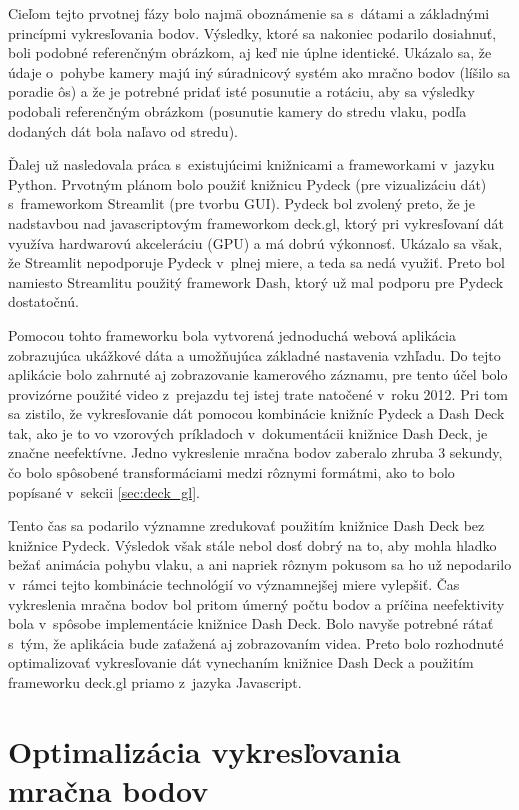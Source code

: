 Cieľom tejto prvotnej fázy bolo najmä oboznámenie sa s~dátami a základnými princípmi vykresľovania bodov. Výsledky, ktoré sa nakoniec podarilo dosiahnuť, boli podobné referenčným obrázkom, aj keď nie úplne identické. Ukázalo sa, že údaje o~pohybe kamery majú iný súradnicový systém ako mračno bodov (líšilo sa poradie ôs) a že je potrebné pridať isté posunutie a rotáciu, aby sa výsledky podobali referenčným obrázkom (posunutie kamery do stredu vlaku, podľa dodaných dát bola naľavo od stredu).

Ďalej už nasledovala práca s~existujúcimi knižnicami a frameworkami v~jazyku Python. Prvotným plánom bolo použiť knižnicu Pydeck (pre vizualizáciu dát) s~frameworkom Streamlit (pre tvorbu GUI). Pydeck bol zvolený preto, že je nadstavbou nad javascriptovým frameworkom deck.gl, ktorý pri vykresľovaní dát využíva hardwarovú akceleráciu (GPU) a má dobrú výkonnosť. Ukázalo sa však, že Streamlit nepodporuje Pydeck v~plnej miere, a teda sa nedá využiť. Preto bol namiesto Streamlitu použitý framework Dash, ktorý už mal podporu pre Pydeck dostatočnú.

Pomocou tohto frameworku bola vytvorená jednoduchá webová aplikácia zobrazujúca ukážkové dáta a umožňujúca základné nastavenia vzhľadu. Do tejto aplikácie bolo zahrnuté aj zobrazovanie kamerového záznamu, pre tento účel bolo provizórne použité video z~prejazdu tej istej trate natočené v~roku 2012. Pri tom sa zistilo, že vykresľovanie dát pomocou kombinácie knižníc Pydeck a Dash Deck tak, ako je to vo vzorových príkladoch v~dokumentácii knižnice Dash Deck, je značne neefektívne. Jedno vykreslenie mračna bodov zaberalo zhruba 3 sekundy, čo bolo spôsobené transformáciami medzi rôznymi formátmi, ako to bolo popísané v~sekcii \ref{sec:deck_gl}.

Tento čas sa podarilo významne zredukovať použitím knižnice Dash Deck bez knižnice Pydeck. Výsledok však stále nebol dosť dobrý na to, aby mohla hladko bežať animácia pohybu vlaku, a ani napriek rôznym pokusom sa ho už nepodarilo v~rámci tejto kombinácie technológií vo významnejšej miere vylepšiť. Čas vykreslenia mračna bodov bol pritom úmerný počtu bodov a príčina neefektivity bola v~spôsobe implementácie knižnice Dash Deck. Bolo navyše potrebné rátať s~tým, že aplikácia bude zaťažená aj zobrazovaním videa. Preto bolo rozhodnuté optimalizovať vykresľovanie dát vynechaním knižnice Dash Deck a použitím frameworku deck.gl priamo z~jazyka Javascript.

\section{Optimalizácia vykresľovania mračna bodov}

